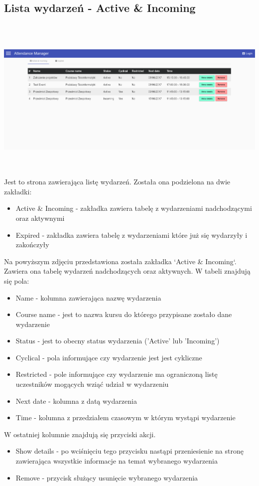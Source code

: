 \subsection{Lista wydarzeń - Active \& Incoming}
\includegraphics[height=8cm,width=15cm]{images/EventsListIncomingAndActive}
Jest to strona zawierająca listę wydarzeń. Została ona podzielona na dwie zakładki:
\begin{itemize}
    \item Active & Incoming - zakładka zawiera tabelę z wydarzeniami nadchodzącymi oraz aktywnymi
    \item Expired - zakładka zawiera tabelę z wydarzeniami które już się wydarzyły i zakończyły
\end{itemize}
Na powyższym zdjęciu przedstawiona została zakładka `Active & Incoming`. Zawiera ona tabelę wydarzeń nadchodzących oraz aktywnych. W tabeli znajdują się pola:
\begin{itemize}
    \item Name - kolumna zawierająca nazwę wydarzenia
    \item Course name - jest to nazwa kursu do którego przypisane zostało dane wydarzenie
    \item Status - jest to obecny status wydarzenia ('Active' lub 'Incoming')
    \item Cyclical - pola informujące czy wydarzenie jest jest cykliczne
    \item Restricted - pole informujące czy wydarzenie ma ograniczoną listę uczestników mogących wziąć udział w wydarzeniu
    \item Next date - kolumna z datą wydarzenia
    \item Time - kolumna z przedziałem czasowym w którym wystąpi wydarzenie
\end{itemize}
W ostatniej kolumnie znajdują się przyciski akcji.
\begin{itemize}
    \item Show details - po wciśnięciu tego przycisku nastąpi przeniesienie na stronę zawierająca wszystkie informacje na temat wybranego wydarzenia
    \item Remove - przycisk służący usunięcie wybranego wydarzenia
\end{itemize}

